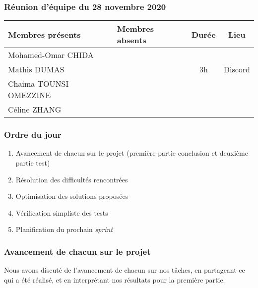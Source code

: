 


% 
\subsubsection*{\large{Réunion d'équipe du 28 novembre 2020}}
\begin{center}
\begin{tabular}{| l | l || c | c |}
    \hline
    Membres présents & Membres absents & Durée & Lieu \\
    \hline
    Mohamed-Omar CHIDA & & & \\ Mathis DUMAS & & 3h & Discord \\ Chaima TOUNSI OMEZZINE & & & \\ Céline ZHANG & & & \\
    \hline
\end{tabular}
\end{center}

\subsubsection*{Ordre du jour}
\begin{enumerate}
    \item Avancement de chacun sur le projet (première partie conclusion et deuxième partie test)
    \item Résolution des difficultés rencontrées
    \item Optimisation des solutions proposées
    \item Vérification simpliste des tests
    \item Planification du prochain \textsl{sprint}
\end{enumerate}

\subsubsection*{Avancement de chacun sur le projet}
Nous avons discuté de l'avancement de chacun sur nos tâches, en partageant ce qui a été réalisé, et en interprétant nos résultats pour la première partie.
